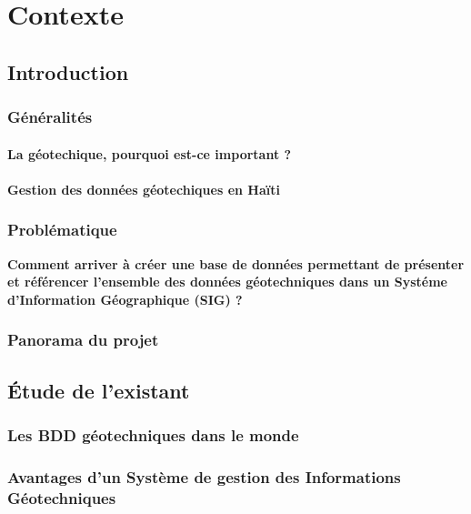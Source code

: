 \chapter{Contexte}
    \section{Introduction}
        
        \subsection{Généralités}
            \subsubsection{La géotechique, pourquoi est-ce important ?}
            
            \subsubsection{Gestion des données géotechiques en Haïti}
                
        \subsection{Problématique}
        \textbf{Comment arriver à créer une base de données permettant de 
        présenter et référencer l'ensemble des données géotechniques dans un Systéme
        d’Information Géographique (SIG) ?}
       
        \subsection{Panorama du projet}
            

    \section{Étude de l'existant}
        \subsection{Les BDD géotechniques dans le monde}
            
        \subsection{Avantages d'un Système de gestion des Informations Géotechniques}
            

